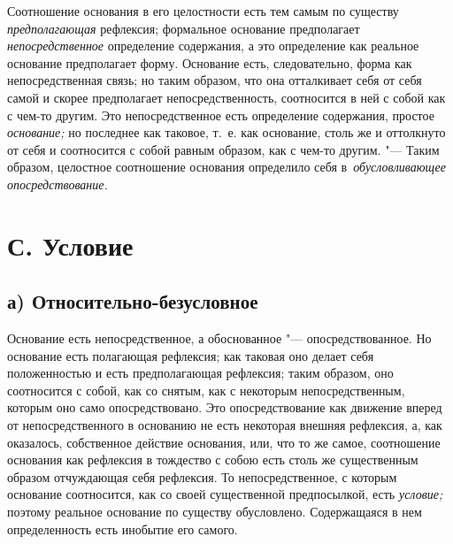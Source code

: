 Соотношение основания в его целостности есть тем самым по существу
{\em предполагающая} рефлексия; формальное основание
предполагает {\em непосредственное} определение
содержания, а это определение как реальное основание предполагает форму.
Основание есть, следовательно, форма как непосредственная связь; но таким
образом, что она отталкивает себя от себя самой и скорее предполагает
непосредственность, соотносится в ней с собой как с чем-то другим. Это
непосредственное есть определение содержания, простое
{\em основание;} но последнее как таковое, т.~е. как
основание, столь же и оттолкнуто от себя и соотносится с собой равным
образом, как с чем-то другим. "--- Таким образом, целостное соотношение
основания определило себя в~{\em обусловливающее опосредствование.}

\section[С. Условие]{С. Условие}

\subsection[а) Относительно-безусловное]{а) Относительно-безусловное}

Основание есть непосредственное, а обоснованное
"--- опосредствованное. Но основание есть полагающая рефлексия; как таковая
оно делает себя положенностью и есть предполагающая рефлексия; таким
образом, оно соотносится с собой, как со снятым, как с некоторым
непосредственным, которым оно само опосредствовано. Это опосредствование
как движение вперед от непосредственного в основанию не есть некоторая
внешняя рефлексия, а, как оказалось, собственное действие основания, или,
что то же самое, соотношение основания как рефлексия в тождество с собою
есть столь же существенным образом отчуждающая себя рефлексия. То
непосредственное, с которым основание соотносится, как со своей
существенной предпосылкой, есть {\em условие;} поэтому
реальное основание по существу обусловлено. Содержащаяся в нем
определенность есть инобытие его самого.

